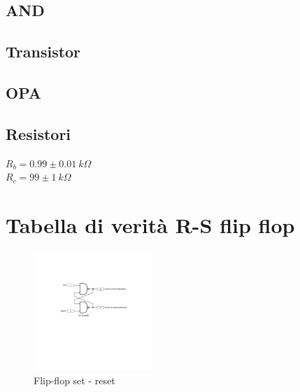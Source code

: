\documentclass[journal]{IEEEtran}
\begin{document}
\subsection{AND}

\subsection{Transistor}

\subsection{OPA}

\subsection{Resistori}
$R_b = 0.99 \pm 0.01 \ k\Omega$ \\
$R_c = 99 \pm 1 \ k\Omega$









\section{Tabella di verità R-S flip flop}

\begin{figure}[H]%
\begin{center}
\includegraphics[width=0.40\textwidth]{sch-simulations/digital/output/flip-flop-RS.pdf}
\caption{Flip-flop set - reset}
\label{fig:circuit_flip_flop}
\end{center}
\end{figure}

\end{document}
